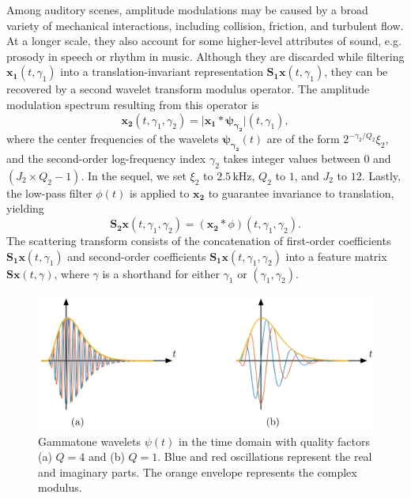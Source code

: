 \documentclass[journal]{IEEEtran}
\makeatletter
\newcommand*{\eg}{e.g.\@\xspace}
\makeatother
\begin{document}
Among auditory scenes, amplitude modulations may be caused by a broad variety of mechanical interactions, including collision, friction, and turbulent flow.
At a longer scale, they also account for some higher-level attributes of sound, \eg prosody in speech or rhythm in music.
Although they are discarded while filtering $\boldsymbol{x_1}(t,\gamma_1)$ into a translation-invariant representation $\mathbf{S_1}\boldsymbol{x}(t,\gamma_1)$, they can be recovered by a second wavelet transform modulus operator.
The amplitude modulation spectrum resulting from this operator is
\begin{equation}
\boldsymbol{x_2}(t,\gamma_1,\gamma_2) =
\vert \boldsymbol{x_1} \ast \boldsymbol{\psi_{\gamma_2}} \vert(t,\gamma_1),
\end{equation}
where the center frequencies of the wavelets $\boldsymbol{\psi_{\gamma_2}}(t)$ are of the form $2^{-\gamma_2/Q_2} \xi_2$, and the second-order log-frequency index $\gamma_2$ takes integer values between $0$ and $(J_2 \times Q_2 - 1)$.
In the sequel, we set $\xi_2$ to $2.5\,\mathrm{kHz}$, $Q_2$ to $1$, and $J_2$ to $12$. Lastly, the low-pass filter $\phi(t)$ is applied to $\boldsymbol{x_2}$ to guarantee invariance to translation, yielding
\begin{equation}
\mathbf{S_2}\boldsymbol{x}(t,\gamma_1,\gamma_2) =
(\boldsymbol{x_2} \ast \phi)(t,\gamma_1,\gamma_2).
\end{equation}
The scattering transform consists of the concatenation of first-order coefficients $\mathbf{S_1}\boldsymbol{x}(t,\gamma_1)$ and second-order coefficients $\mathbf{S_1}\boldsymbol{x}(t,\gamma_1,\gamma_2)$ into a feature matrix $\mathbf{S}\boldsymbol{x}(t,\gamma)$, where $\gamma$ is a shorthand for either $\gamma_1$ or $(\gamma_1,\gamma_2)$.

\begin{figure}
\begin{center}
\includegraphics[width=\columnwidth]{gammatones.png}
\caption{
\label{fig:gammatones}
Gammatone wavelets $\psi(t)$ in the time domain with quality factors (a) $Q = 4$ and (b) $Q = 1$. Blue and red oscillations represent the real and imaginary parts. The orange envelope represents the complex modulus.}
\end{center}
\end{figure}
\end{document}
